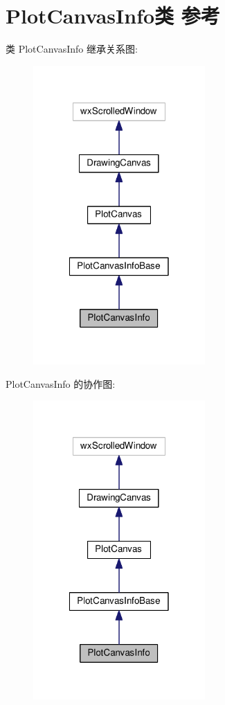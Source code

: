 \hypertarget{class_plot_canvas_info}{\section{Plot\+Canvas\+Info类 参考}
\label{class_plot_canvas_info}
}


类 Plot\+Canvas\+Info 继承关系图\+:
\nopagebreak
\begin{figure}[H]
\begin{center}
\leavevmode
\includegraphics[width=186pt]{class_plot_canvas_info__inherit__graph}
\end{center}
\end{figure}


Plot\+Canvas\+Info 的协作图\+:
\nopagebreak
\begin{figure}[H]
\begin{center}
\leavevmode
\includegraphics[width=186pt]{class_plot_canvas_info__coll__graph}
\end{center}
\end{figure}
